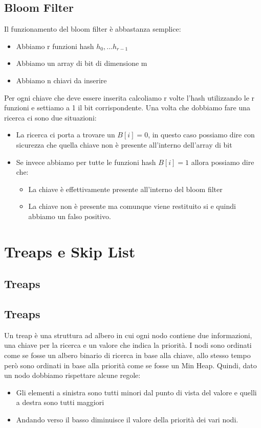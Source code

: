 \documentclass[12pt]{article}
\begin{document}
\subsection{Bloom Filter}

Il funzionamento del bloom filter è abbastanza semplice:
\begin{itemize}
\item Abbiamo r funzioni hash $h_0,...h_{r-1}$
\item Abbiamo un array di bit di dimensione m
\item Abbiamo n chiavi da inserire
\end{itemize}

Per ogni chiave che deve essere inserita calcoliamo r volte l'hash utilizzando le r funzioni e settiamo a 1 il bit corrispondente.
Una volta che dobbiamo fare una ricerca ci sono due situazioni:
\begin{itemize}
\item La ricerca ci porta a trovare un $B[i]=0$, in questo caso possiamo dire con sicurezza che quella chiave non è presente all'interno dell'array di bit
\item Se invece abbiamo per tutte le funzioni hash $B[i]=1$ allora possiamo dire che:
\begin{itemize}
\item La chiave è effettivamente presente all'interno del bloom filter
\item La chiave non è presente ma comunque viene restituito si e quindi abbiamo un falso positivo.
\end{itemize}
\end{itemize}


\section{Treaps e Skip List}


\subsection{Treaps}

\subsection{Treaps}

Un treap è una struttura ad albero in cui ogni nodo contiene due informazioni, una chiave per la ricerca e un valore che indica la priorità. I nodi sono ordinati come se fosse un albero binario di ricerca in base alla chiave, allo stesso tempo però sono ordinati in base alla priorità come se fosse un Min Heap.
Quindi, dato un nodo dobbiamo rispettare alcune regole:
\begin{itemize}
\item Gli elementi a sinistra sono tutti minori dal punto di vista del valore e quelli a destra sono tutti maggiori
\item Andando verso il basso diminuisce il valore della priorità dei vari nodi.
\end{itemize}
\end{document}
